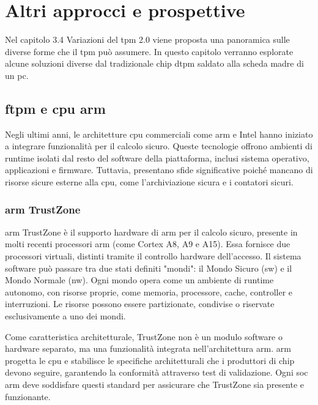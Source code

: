 \chapter{Altri approcci e prospettive}\label{approcci}

Nel capitolo 3.4 Variazioni del \acrshort{tpm} 2.0 viene proposta una panoramica sulle diverse forme che il \acrshort{tpm} può assumere. In questo capitolo verranno esplorate alcune soluzioni diverse dal tradizionale chip \acrshort{dtpm} saldato alla scheda madre di un \acrshort{pc}.

\section{\texorpdfstring{\acrshort{ftpm} e \acrshort{cpu} \acrshort{arm}}{fTPM e CPU ARM}}\label{sec:ftpm_cpu_arm}

Negli ultimi anni, le architetture \acrshort{cpu} commerciali come \acrshort{arm} e Intel hanno iniziato a integrare funzionalità per il calcolo sicuro. Queste tecnologie offrono ambienti di runtime isolati dal resto del software della piattaforma, inclusi sistema operativo, applicazioni e firmware. Tuttavia, presentano sfide significative poiché mancano di risorse sicure esterne alla \acrshort{cpu}, come l'archiviazione sicura e i contatori sicuri. 

\subsection{\texorpdfstring{\acrshort{arm} TrustZone}{ARM TrustZone}}\label{subsec:arm_trustzone}

\acrshort{arm} TrustZone è il supporto hardware di \acrshort{arm} per il calcolo sicuro, presente in molti recenti processori \acrshort{arm} (come Cortex A8, A9 e A15). Essa fornisce due processori virtuali, distinti tramite il controllo hardware dell'accesso. Il sistema software può passare tra due stati definiti "mondi": il Mondo Sicuro (\acrshort{sw}) e il Mondo Normale (\acrshort{nw}). Ogni mondo opera come un ambiente di runtime autonomo, con risorse proprie, come memoria, processore, cache, controller e interruzioni. Le risorse possono essere partizionate, condivise o riservate esclusivamente a uno dei mondi.

Come caratteristica architetturale, TrustZone non è un modulo software o hardware separato, ma una funzionalità integrata nell'architettura \acrshort{arm}. \acrshort{arm} progetta le \acrshort{cpu} e stabilisce le specifiche architetturali che i produttori di chip devono seguire, garantendo la conformità attraverso test di validazione. Ogni \acrshort{soc} \acrshort{arm} deve soddisfare questi standard per assicurare che TrustZone sia presente e funzionante.

